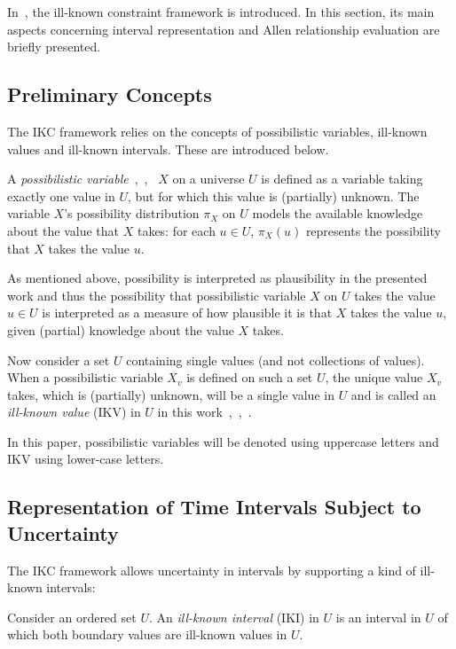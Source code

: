 In~\cite{Pons2011}, the ill-known constraint framework is introduced. In this section, its main aspects concerning interval representation and Allen relationship evaluation are briefly presented.

\subsection{\label{subsec:ikc-preliminaries}Preliminary Concepts}
The IKC framework relies on the concepts of possibilistic variables, ill-known values and ill-known intervals. These are introduced below.

\begin{definition}
\label{def:poss-variable}
A \emph{possibilistic variable}~\cite{Dubois1988a},~\cite{Pons2011},~\cite{Billiet2012} $X$ on a universe $U$ is defined as a variable taking exactly one value in $U$, but for which this value is (partially) unknown. The variable $X$'s possibility distribution $\pi_X$ on $U$ models the available knowledge about the value that $X$ takes: for each $u \in U$, $\pi_X(u)$ represents the possibility that $X$ takes the value $u$.
\end{definition}

As mentioned above, possibility is interpreted as plausibility in the presented work and thus the possibility that possibilistic variable $X$ on $U$ takes the value $u \in U$ is interpreted as a measure of how plausible it is that $X$ takes the value $u$, given (partial) knowledge about the value $X$ takes.

Now consider a set $U$ containing single values (and not collections of values). When a possibilistic variable $X_{v}$ is defined on such a set $U$, the unique value $X_{v}$ takes, which is (partially) unknown, will be a single value in $U$ and is called an \emph{ill-known value} (IKV) in $U$ in this work~\cite{Dubois1988},~\cite{Pons2011},~\cite{Billiet2012}.

In this paper, possibilistic variables will be denoted using uppercase letters and IKV using lower-case letters.

\subsection{\label{subsec:ikc-interval}Representation of Time Intervals Subject to Uncertainty}
The IKC framework allows uncertainty in intervals by supporting a kind of ill-known intervals:

\begin{definition}
Consider an ordered set $U$. An \emph{ill-known interval} (IKI) in $U$ is an interval in $U$ of which both boundary values are ill-known values in $U$.
\end{definition}

